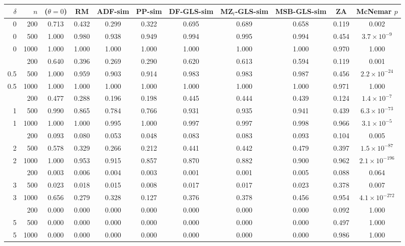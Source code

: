 \begin{tabular}{r r c c c c c c c c c }
\toprule
$\delta$ & $n$ & \RMGLS{} ($\theta = 0$) & RM & ADF-sim & PP-sim & DF-GLS-sim & MZ$_t$-GLS-sim & MSB-GLS-sim & ZA & McNemar $p$ \\
\midrule
0 & 200 & 0.713 & 0.432 & 0.299 & 0.322 & 0.695 & 0.689 & 0.658 & 0.119 & 0.002 \\
0 & 500 & 1.000 & 0.980 & 0.938 & 0.949 & 0.994 & 0.995 & 0.994 & 0.454 & $3.7\times10^{-9}$ \\
0 & 1000 & 1.000 & 1.000 & 1.000 & 1.000 & 1.000 & 1.000 & 1.000 & 0.970 & 1.000 \\
\addlinespace
0.5 & 200 & 0.640 & 0.396 & 0.269 & 0.290 & 0.620 & 0.613 & 0.594 & 0.119 & 0.001 \\
0.5 & 500 & 1.000 & 0.959 & 0.903 & 0.914 & 0.983 & 0.983 & 0.987 & 0.456 & $2.2\times10^{-24}$ \\
0.5 & 1000 & 1.000 & 1.000 & 1.000 & 1.000 & 1.000 & 1.000 & 1.000 & 0.971 & 1.000 \\
\addlinespace
1 & 200 & 0.477 & 0.288 & 0.196 & 0.198 & 0.445 & 0.444 & 0.439 & 0.124 & $1.4\times10^{-7}$ \\
1 & 500 & 0.990 & 0.865 & 0.784 & 0.766 & 0.931 & 0.935 & 0.941 & 0.439 & $6.3\times10^{-73}$ \\
1 & 1000 & 1.000 & 1.000 & 0.995 & 1.000 & 0.997 & 0.997 & 0.998 & 0.966 & $3.1\times10^{-5}$ \\
\addlinespace
2 & 200 & 0.093 & 0.080 & 0.053 & 0.048 & 0.083 & 0.083 & 0.093 & 0.104 & 0.005 \\
2 & 500 & 0.578 & 0.329 & 0.266 & 0.212 & 0.441 & 0.442 & 0.479 & 0.397 & $1.5\times10^{-87}$ \\
2 & 1000 & 1.000 & 0.953 & 0.915 & 0.857 & 0.870 & 0.882 & 0.900 & 0.962 & $2.1\times10^{-196}$ \\
\addlinespace
3 & 200 & 0.003 & 0.006 & 0.004 & 0.003 & 0.001 & 0.001 & 0.005 & 0.088 & 0.064 \\
3 & 500 & 0.023 & 0.018 & 0.015 & 0.008 & 0.017 & 0.017 & 0.023 & 0.378 & 0.007 \\
3 & 1000 & 0.656 & 0.279 & 0.328 & 0.127 & 0.376 & 0.378 & 0.456 & 0.954 & $4.1\times10^{-272}$ \\
\addlinespace
5 & 200 & 0.000 & 0.000 & 0.000 & 0.000 & 0.000 & 0.000 & 0.000 & 0.092 & 1.000 \\
5 & 500 & 0.000 & 0.000 & 0.000 & 0.000 & 0.000 & 0.000 & 0.000 & 0.497 & 1.000 \\
5 & 1000 & 0.000 & 0.000 & 0.000 & 0.000 & 0.000 & 0.000 & 0.000 & 0.986 & 1.000 \\
\bottomrule
\end{tabular}
